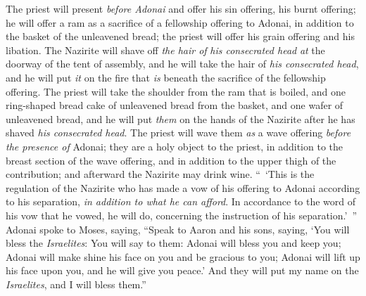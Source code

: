 \begin{biblechapter}
\verse The priest will present \textit{before Adonai} and offer his sin offering, his burnt offering;
\verse he will offer a ram as a sacrifice of a fellowship offering to Adonai, in addition to the basket of the unleavened bread; the priest will offer his grain offering and his libation.
\verse The Nazirite will shave off \textit{the hair of} \textit{his consecrated head} \textit{at} the doorway of the tent of assembly, and he will take the hair of \textit{his consecrated head}, and he will put \textit{it} on the fire that \textit{is} beneath the sacrifice of the fellowship offering.
\verse The priest will take the shoulder from the ram that is boiled, and one ring-shaped bread cake of unleavened bread from the basket, and one wafer of unleavened bread, and he will put \textit{them} on the hands of the Nazirite after he has shaved \textit{his consecrated head}.
\verse The priest will wave them \textit{as} a wave offering \textit{before the presence of} Adonai; they are a holy object to the priest, in addition to the breast section of the wave offering, and in addition to the upper thigh of the contribution; and afterward the Nazirite may drink wine.
\verse “ ‘This is the regulation of the Nazirite who has made a vow of his offering to Adonai according to his separation, \textit{in addition to what he can afford}. In accordance to the word of his vow that he vowed, he will do, concerning the instruction of his separation.’ ”
 Adonai spoke to Moses, saying,
\verse “Speak to Aaron and his sons, saying, ‘You will bless the \textit{Israelites}: You will say to them:
\verse Adonai will bless you 
and keep you;
\verse Adonai will make shine his face on you 
and be gracious to you;
\verse Adonai will lift up his face upon you, 
and he will give you peace.’
\verse And they will put my name on the \textit{Israelites}, and I will bless them.”
\end{biblechapter}

